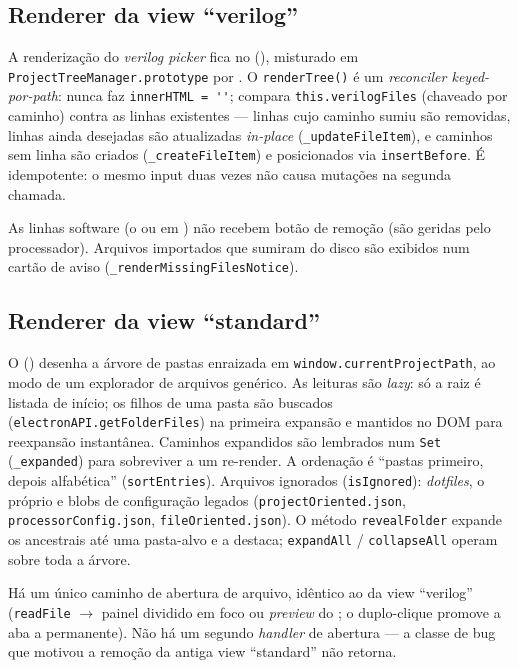\subsection{Renderer da view \enquote{verilog}}

A renderização do \emph{verilog picker} fica no 
(), misturado em
\lstinline|ProjectTreeManager.prototype| por . O
\lstinline|renderTree()| é um \emph{reconciler keyed-por-path}: nunca faz
\lstinline|innerHTML = ''|; compara \lstinline|this.verilogFiles| (chaveado por
caminho) contra as linhas existentes — linhas cujo caminho sumiu são removidas,
linhas ainda desejadas são atualizadas \emph{in-place}
(\lstinline|_updateFileItem|), e caminhos sem linha são criados
(\lstinline|_createFileItem|) e posicionados via \lstinline|insertBefore|. É
idempotente: o mesmo input duas vezes não causa mutações na segunda chamada.

As linhas software (o  ou  em ) não recebem botão de
remoção (são geridas pelo processador). Arquivos importados que sumiram do disco
são exibidos num cartão de aviso (\lstinline|_renderMissingFilesNotice|).

\subsection{Renderer da view \enquote{standard}}

O  ()
desenha a árvore de pastas enraizada em \lstinline|window.currentProjectPath|,
ao modo de um explorador de arquivos genérico. As leituras são \emph{lazy}: só
a raiz é listada de início; os filhos de uma pasta são buscados
(\lstinline|electronAPI.getFolderFiles|) na primeira expansão e mantidos no DOM
para reexpansão instantânea. Caminhos expandidos são lembrados num
\lstinline|Set| (\lstinline|_expanded|) para sobreviver a um re-render. A
ordenação é \enquote{pastas primeiro, depois alfabética} (\lstinline|sortEntries|).
Arquivos ignorados (\lstinline|isIgnored|): \emph{dotfiles}, o próprio
 e blobs de configuração legados
(\lstinline|projectOriented.json|, \lstinline|processorConfig.json|,
\lstinline|fileOriented.json|). O método \lstinline|revealFolder| expande os
ancestrais até uma pasta-alvo e a destaca; \lstinline|expandAll| /
\lstinline|collapseAll| operam sobre toda a árvore.

\begin{nota}
Há um único caminho de abertura de arquivo, idêntico ao da view \enquote{verilog}
(\lstinline|readFile| $\rightarrow$ painel dividido em foco ou \emph{preview} do
; o duplo-clique promove a aba a permanente). Não há um segundo
\emph{handler} de abertura — a classe de bug que motivou a remoção da antiga
view \enquote{standard} não retorna.
\end{nota}

